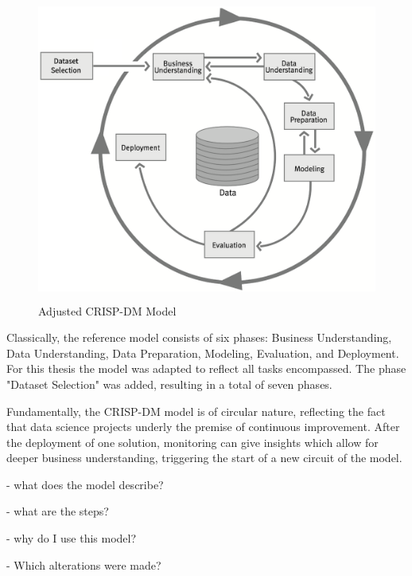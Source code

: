 \begin{figure}[ht]
	\centering
	\includegraphics[height=10cm]{Bilder/Research_Model.png}
	\caption{Adjusted CRISP-DM Model}
	\label{fig:CRISM-DM}
\end{figure}

Classically, the reference model consists of six phases: Business Understanding, Data Understanding, Data Preparation, Modeling, Evaluation, and Deployment. For this thesis the model was adapted to reflect all tasks encompassed. The phase "Dataset Selection" was added, resulting in a total of seven phases.

Fundamentally, the \ac{CRISP-DM} model is of circular nature, reflecting the fact that data science projects underly the premise of continuous improvement. After the deployment of one solution, monitoring can give insights which allow for deeper business understanding, triggering the start of a new circuit of the model.




- what does the model describe?

- what are the steps?

- why do I use this model?

- Which alterations were made?
 